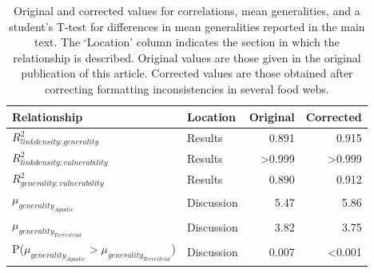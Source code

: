 \documentclass[12pt]{article}
\begin{document}
\begin{spacing}{2.0}
\begin{table}[h!]
\caption{Original and corrected values for correlations, mean generalities, and a student's T-test for differences in mean generalities reported in the main text. The `Location' column indicates the section in which the relationship is described. Original values are those given in the original publication of this article. Corrected values are those obtained after correcting formatting inconsistencies in several food webs.}
\label{corr_comparison}
\small
\begin{tabular}{l l | r | r}
Relationship & Location & Original & Corrected \\
\hline
$R^2_{link density:generality}$ & Results & 0.891 & 0.915 \\
$R^2_{link density:vulnerability}$ & Results & \textgreater0.999 & \textgreater0.999 \\
$R^2_{generality:vulnerability}$ & Results & 0.890 & 0.912 \\
$\mu_{generality_{Aquatic}}$ & Discussion & 5.47 & 5.86 \\
$\mu_{generality_{Terrestrial}}$ & Discussion & 3.82 & 3.75 \\
P($\mu_{generality_{Aquatic}}>\mu_{generality_{Terrestrial}}$) & Discussion & 0.007 & \textless0.001 \\
\end{tabular}
\end{table}



\end{spacing}
\end{document}
